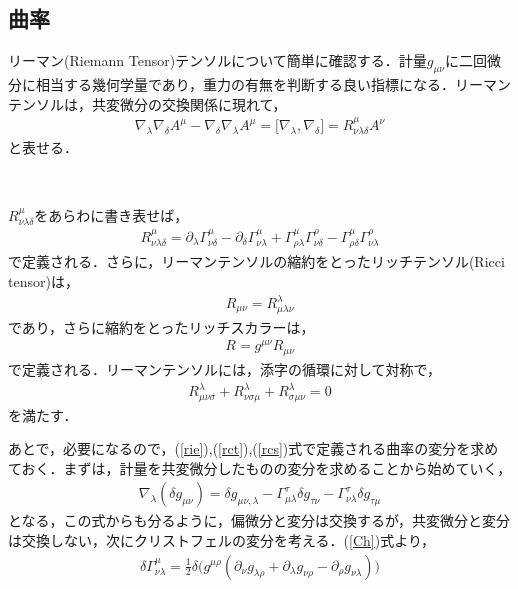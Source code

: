 \subsection{曲率}
リーマン(Riemann Tensor)テンソルについて簡単に確認する．計量$g_{\mu\nu}$に二回微分に相当する幾何学量であり，重力の有無を判断する良い指標になる．リーマンテンソルは，共変微分の交換関係に現れて，
\begin{eqnarray}
\label{RRR}
\nabla_{\lambda}\nabla_{\delta}A^{\mu}-\nabla_{\delta}\nabla_{\lambda}A^{\mu}=\bigl[\nabla_{\lambda},\nabla_{\delta}\bigr]=R^{\mu}_{\nu\lambda\delta}A^{\nu}
\end{eqnarray}
と表せる．
\begin{empheqboxed}
\

$R^{\mu}_{\nu\lambda\delta}$をあらわに書き表せば，
\begin{eqnarray}
\label{rie}
R^{\mu}_{\nu\lambda\delta}=\partial_{\lambda}\Gamma^{\mu}_{\nu\delta}-\partial_{\delta}\Gamma^{\mu}_{\nu\lambda}+\Gamma^{\mu}_{\rho\lambda}\Gamma^{\rho}_{\nu\delta}-\Gamma^{\mu}_{\rho\delta}\Gamma^{\rho}_{\nu\lambda}
\end{eqnarray}
で定義される．さらに，リーマンテンソルの縮約をとったリッチテンソル(Ricci tensor)は，
\begin{eqnarray}
\label{rct}
R_{\mu\nu}=R^{\lambda}_{\mu\lambda\nu}
\end{eqnarray}
であり，さらに縮約をとったリッチスカラーは，
\begin{eqnarray}
\label{rcs}
R=g^{\mu\nu}R_{\mu\nu}
\end{eqnarray}
で定義される．リーマンテンソルには，添字の循環に対して対称で，
\begin{eqnarray}
\label{Rcycle}
R^{\lambda}_{\mu\nu\sigma}+R^{\lambda}_{\nu\sigma\mu}+R^{\lambda}_{\sigma\mu\nu}=0
\end{eqnarray}を満たす．
\end{empheqboxed}
あとで，必要になるので，(\ref{rie}),(\ref{rct}),(\ref{rcs})式で定義される曲率の変分を求めておく．まずは，計量を共変微分したものの変分を求めることから始めていく，
\begin{eqnarray}
\label{hendg}
\nabla_{\lambda}(\delta g_{\mu\nu})=\delta g_{\mu\nu,\lambda}-\Gamma_{\mu\lambda}^{\tau}\delta g_{\tau\nu}-\Gamma_{\nu\lambda}^{\tau}\delta g_{\tau\mu}
\end{eqnarray}
となる，この式からも分るように，偏微分と変分は交換するが，共変微分と変分は交換しない，次にクリストフェルの変分を考える．(\ref{Ch})式より，
\begin{eqnarray}
\delta \Gamma^{\mu}_{\nu\lambda}=\frac{1}{2}\delta\biggl(g^{\mu\rho}(\partial_\nu g_{\lambda\rho}+\partial_\lambda g_{\nu\rho} - \partial_\rho g_{\nu\lambda})\biggr)
\end{eqnarray}
